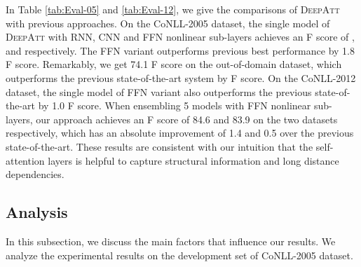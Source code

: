 \documentclass[letterpaper]{article} \usepackage{aaai18}  \usepackage{times}  \usepackage{helvet}  \usepackage{courier}  \usepackage{url}  \usepackage{graphicx}  \frenchspacing  \setlength{\pdfpagewidth}{8.5in}  \setlength{\pdfpageheight}{11in}  \usepackage{latexsym}
\begin{document}
In Table \ref{tab:Eval-05} and \ref{tab:Eval-12}, we give the comparisons of \textsc{DeepAtt} with previous approaches.  On the CoNLL-2005 dataset, the single model of \textsc{DeepAtt} with RNN, CNN and FFN nonlinear sub-layers achieves an F score of ,  and  respectively. The FFN variant outperforms previous best performance by 1.8 F score. Remarkably, we get 74.1 F score on the out-of-domain dataset, which outperforms the previous state-of-the-art system by  F score. On the CoNLL-2012 dataset, the single model of FFN variant also outperforms the previous state-of-the-art by 1.0 F score. When ensembling 5 models with FFN nonlinear sub-layers, our approach achieves an F score of 84.6 and 83.9 on the two datasets respectively, which has an absolute improvement of 1.4 and 0.5 over the previous state-of-the-art. These results are consistent with our intuition that the self-attention layers is helpful to capture structural information and long distance dependencies.

\subsection{Analysis}
In this subsection, we discuss the main factors that influence our results. We analyze the experimental results on the development set of CoNLL-2005 dataset.

\begin{table}[htb]
\centering
{}
\caption{\label{tab:EXP-Group} Detailed results on the CoNLL-2005 development set. \textsc{PE} denotes the way to encoding word positions. GloVe refers to the GloVe embedding pre-trained on 6B tokens.}
\end{table}
\end{document}
